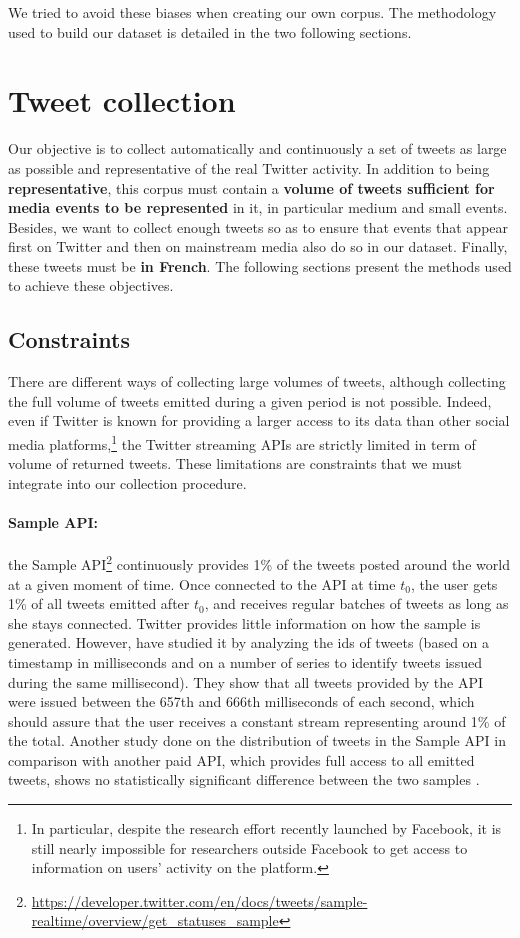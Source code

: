 We tried to avoid these biases when creating our own corpus. The methodology used to build our dataset is detailed in the two following sections.

\section{Tweet collection}
\label{Tweet collection}
Our objective is to collect automatically and continuously a set of tweets as large as possible and representative of the real Twitter activity. In addition to being \textbf{representative}, this corpus must contain a \textbf{volume of tweets sufficient for media events to be represented} in it, in particular medium and small events.
Besides, we want to collect enough tweets so as to ensure that events that appear first on Twitter and then on
mainstream media also do so in our dataset. Finally, these tweets must be \textbf{in French}.
The following sections present the methods used to achieve these objectives.

\subsection{Constraints}
There are different ways of collecting large volumes of tweets, although collecting the full volume of tweets emitted during a given period is not possible. Indeed, even if Twitter is known for providing a larger access to its data than other social media platforms,\footnote{In particular, despite the research effort recently launched by Facebook, it is still nearly impossible for researchers outside Facebook to get access to information on users' activity on the platform.} the Twitter streaming APIs are strictly limited in term of volume of returned tweets. These limitations are constraints that we must integrate into our collection procedure.
	
	


\paragraph{Sample API:}

the Sample API\footnote{\url{https://developer.twitter.com/en/docs/tweets/sample-realtime/overview/get_statuses_sample}} continuously provides 1\% of the tweets posted around the world at a given moment of time. Once connected to the API at time $t_0$, the user gets 1\% of all tweets emitted after $t_0$, and receives regular batches of tweets as long as she stays connected. Twitter provides little information on how the sample is generated. However,  \citet{kergl_endogenesis_2014} have studied it by analyzing the ids of tweets (based on a timestamp in milliseconds and on a number of series to identify tweets issued during the same millisecond). They show that all tweets provided by the API were issued between the 657th and 666th milliseconds of each second, which should assure that the user receives a constant stream representing around 1\% of the total. Another study done on the distribution of tweets in the Sample API in comparison with another paid API, which provides full access to all emitted tweets, shows no statistically significant difference between the two samples \citep{morstatter_when_2014}.


